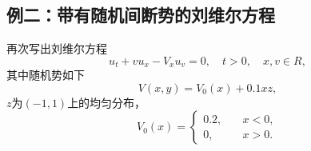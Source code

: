 
\subsection{例二：带有随机间断势的刘维尔方程}

再次写出刘维尔方程
\begin{equation}
  u_t+v u_x-V_x u_v=0, \quad t>0, \quad x,v\in R,
\end{equation}
其中随机势如下
\begin{equation}
  V(x,y)=V_0(x)+0.1xz,
\end{equation}
$z$为$(-1,1)$上的均匀分布，
\begin{equation}
  V_0(x)=
  \begin{cases}
    0.2, \quad &x<0, \\
    0, \quad &x>0.
  \end{cases}
\end{equation}


